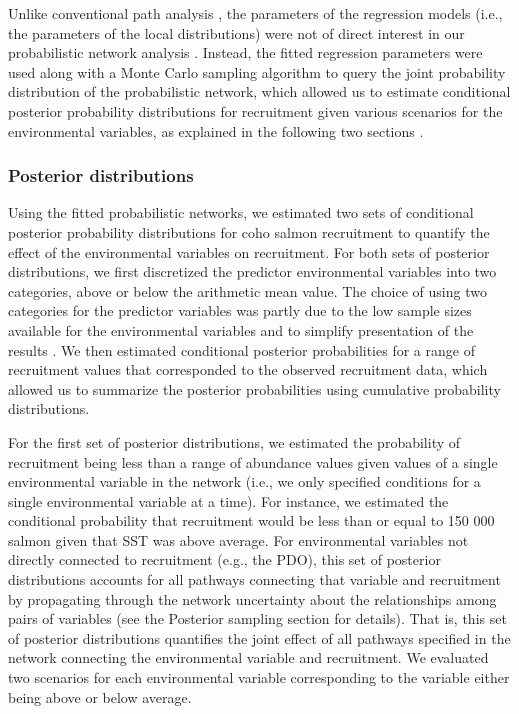 Unlike conventional path analysis \citep{Wright1934}, the parameters of the
regression models (i.e., the parameters of the local distributions) were not of
direct interest in our probabilistic network analysis \citep{Korb2004a,
Koller2009a}. Instead, the fitted regression parameters were used along with a
Monte Carlo sampling algorithm to query the joint probability distribution of
the probabilistic network, which allowed us to estimate conditional posterior
probability distributions for recruitment given various scenarios for the
environmental variables, as explained in the following two sections
\citep{Henrion1988a}.


\subsubsection{Posterior distributions}

Using the fitted probabilistic networks, we estimated two sets of conditional
posterior probability distributions for coho salmon recruitment to quantify the
effect of the environmental variables on recruitment. For both sets of posterior
distributions, we first discretized the predictor environmental variables into
two categories, above or below the arithmetic mean value. The choice of using
two categories for the predictor variables was partly due to the low sample
sizes available for the environmental variables and to simplify presentation of
the results \citep{Koller2009a}. We then estimated conditional posterior
probabilities for a range of recruitment values that corresponded to the
observed recruitment data, which allowed us to summarize the posterior
probabilities using cumulative probability distributions.

For the first set of posterior distributions, we estimated the probability of
recruitment being less than a range of abundance values given values of a single
environmental variable in the network (i.e., we only specified conditions for a
single environmental variable at a time). For instance, we estimated the
conditional probability that recruitment would be less than or equal to 150 000
salmon given that SST was above average. For environmental variables not
directly connected to recruitment (e.g., the PDO), this set of posterior
distributions accounts for all pathways connecting that variable and recruitment
by propagating through the network uncertainty about the relationships among
pairs of variables (see the Posterior sampling section for details). That is,
this set of posterior distributions quantifies the joint effect of all pathways
specified in the network connecting the environmental variable and recruitment.
We evaluated two scenarios for each environmental variable corresponding to the
variable either being above or below average.

